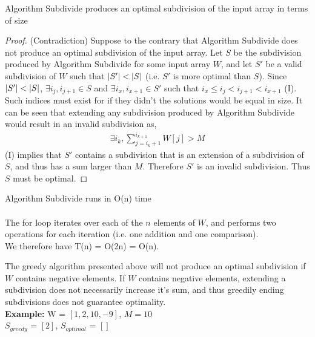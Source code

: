 \documentclass[12pt]{article}
\newenvironment{lemma}[2][Lemma]{\begin{trivlist}
\item[\hskip \labelsep {\bfseries #1}\hskip \labelsep {\bfseries #2.}]}{\end{trivlist}}
\newenvironment{question}[2][Question]{\begin{trivlist}
\item[\hskip \labelsep {\bfseries #1}\hskip \labelsep {\bfseries #2.}]}{\end{trivlist}}
\DeclarePairedDelimiter\abs{\lvert}{\rvert}%
\begin{document}
\begin{question}{1 (a)}
  \pagebreak
  \begin{lemma}{1.2} Algorithm Subdivide produces an optimal subdivision of the
                     input array in terms of size
    \begin{proof} (Contradiction)
      Suppose to the contrary that Algorithm Subdivide does not produce an optimal
      subdivision of the input array. Let $S$ be the subdivision produced by
      Algorithm Subdivide for some input array $W$, and let $S'$ be a valid
      subdivision of $W$ such that $\abs{S'} < \abs{S}$ (i.e. $S'$ is more
      optimal than $S$).  Since $\abs{S'} < \abs{S}$, $\exists i_{j}, i_{j+1} \in S$
      and $\exists i_{x}, i_{x+1} \in S'$ such that $i_{x} \leq i_{j} < i_{j+1} < i_{x+1}$ (I).
      Such indices must exist for if they didn't the solutions would be equal in size.
      It can be seen that extending any subdivision produced by Algorithm Subdivide
      would result in an invalid subdivision as,
      \begin{align*}
        \exists i_{k}, \sum_{j=i_{k}+1}^{i_{k+1}} W[j] > M
      \end{align*}
      (I) implies that $S'$ contains a subdivision that is an extension of
      a subdivision of $S$, and thus has a sum larger than $M$.  Therefore $S'$
      is an invalid subdivision.  Thus $S$ must be optimal.
    \end{proof}
  \end{lemma}

  \begin{lemma}{1.3} Algorithm Subdivide runs in O(n) time
    \leavevmode \\ \\
    The for loop iterates over each of the $n$ elements of $W$, and performs
    two operations for each iteration (i.e. one addition and one comparison). \\
    We therefore have T(n) = O(2n) = O(n).
  \end{lemma}
\end{question}

\begin{question}{1 (b)}
  The greedy algorithm presented above will not produce an optimal subdivision
  if $W$ contains negative elements.  If $W$ contains negative elements, extending
  a subdivision does not necessarily increase it's sum, and thus greedily ending
  subdivisions does not guarantee optimality. \\

  \textbf{Example:}
  W = $[1, 2, 10, -9]$, $M = 10$ \\
  $S_{greedy}$ = $[2]$, $S_{optimal}$ = $[]$ \\
\end{question}
\end{document}
